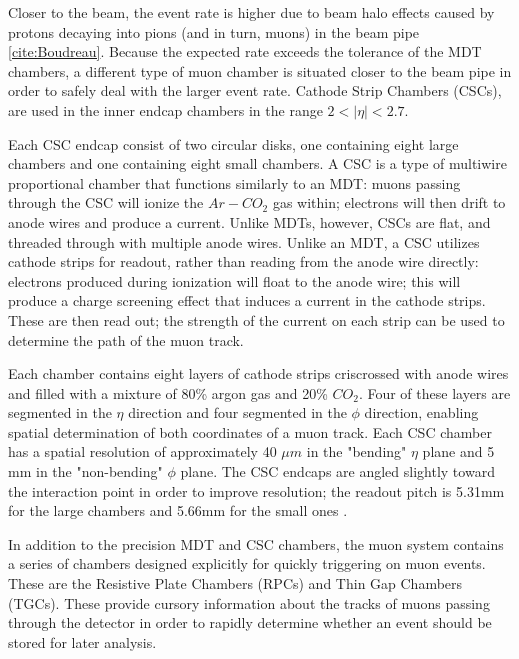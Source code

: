 Closer to the beam, the event rate is higher due to beam halo effects caused by protons decaying into pions (and in turn, muons) in the beam pipe \ref{cite:Boudreau}. Because the expected rate exceeds the tolerance of the MDT chambers, a different type of muon chamber is situated closer to the beam pipe in order to safely deal with the larger event rate. Cathode Strip Chambers (CSCs), are used in the inner endcap chambers in the range $ 2 < | \eta | < 2.7 $.

Each CSC endcap consist of two circular disks, one containing eight large chambers and one containing eight small chambers. A CSC is a type of multiwire proportional chamber that functions similarly to an MDT: muons passing through the CSC will ionize the $Ar-CO_2$ gas within; electrons will then drift to anode wires and produce a current. Unlike MDTs, however, CSCs are flat, and threaded through with multiple anode wires. Unlike an MDT, a CSC utilizes cathode strips for readout, rather than reading from the anode wire directly: electrons produced during ionization will float to the anode wire; this will produce a charge screening effect that induces a current in the cathode strips. These are then read out; the strength of the current on each strip can be used to determine the path of the muon track.

Each chamber contains eight layers of cathode strips criscrossed with anode wires and filled with a mixture of 80\% argon gas and 20\% $CO_2$. Four of these layers are segmented in the $\eta$ direction and four segmented in the $\phi$ direction, enabling spatial determination of both coordinates of a muon track. Each CSC chamber has a spatial resolution of approximately 40 $\mu m$ in the "bending" $\eta$ plane and 5 mm in the "non-bending" $\phi$ plane. The CSC endcaps are angled slightly toward the interaction point in order to improve resolution; the readout pitch is 5.31mm for the large chambers and 5.66mm for the small ones \cite{CSCs}.

In addition to the precision MDT and CSC chambers, the muon system contains a series of chambers designed explicitly for quickly triggering on muon events. These are the Resistive Plate Chambers (RPCs) and Thin Gap Chambers (TGCs). These provide cursory information about the tracks of muons passing through the detector in order to rapidly determine whether an event should be stored for later analysis.

